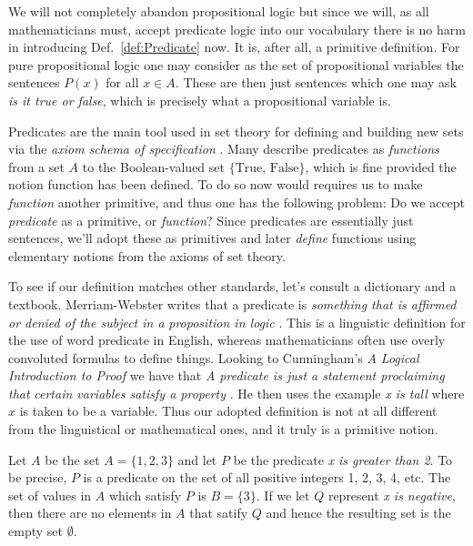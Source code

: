        We will not completely abandon propositional logic but since we will,
        as all mathematicians must, accept predicate logic into our vocabulary
        there is no harm in introducing Def.~\ref{def:Predicate} now. It is,
        after all, a primitive definition. For pure propositional logic one may
        consider as the set of propositional variables the sentences
        $P(x)$ for all $x\in{A}$. These are then just sentences which one may
        ask \textit{is it true or false}, which is precisely what a
        propositional variable is.
        \par\hfill\par
        Predicates are the main tool used in set theory for defining and
        building new sets via the \textit{axiom schema of specification}%
        . Many describe predicates as
        \textit{functions} from a set $A$ to the Boolean-valued set
        $\{\text{True},\,\text{False}\}$, which is fine provided the notion
        function has been defined. To do so now would requires us to make
        \textit{function} another primitive, and thus one has the following
        problem: Do we accept \textit{predicate} as a primitive, or
        \textit{function}? Since predicates are essentially just sentences,
        we'll adopt these as primitives and later \textit{define} functions
        using elementary notions from the axioms of set theory.
        \par\hfill\par
        To see if our definition matches other standards, let's consult a
        dictionary and a textbook. Merriam-Webster writes that a predicate is
        \textit{something that is affirmed or denied of the subject in a}
        \textit{proposition in logic} \cite{MerriamWebsterPredicateDef}. This is
        a linguistic definition for the use of word predicate in English,
        whereas mathematicians often use overly convoluted formulas to define
        things. Looking to Cunningham's \textit{A Logical Introduction to Proof}
        we have that \textit{A predicate is just a statement proclaiming that}
        \textit{certain variables satisfy a property}
        \cite{Cunningham2010}. He then uses the example \textit{x is tall} where
        $x$ is taken to be a variable. Thus our adopted definition is not at all
        different from the linguistical or mathematical ones, and it truly is a
        primitive notion.
        \begin{example}
            Let $A$ be the set $A=\{1,2,3\}$ and let $P$ be the predicate
            \textit{x is greater than 2}. To be precise, $P$ is a predicate on
            the set of all positive integers 1, 2, 3, 4, etc. The set of values
            in $A$ which satisfy $P$ is $B=\{3\}$. If we let $Q$ represent
            \textit{x is negative}, then there are no elements in $A$ that
            satify $Q$ and hence the resulting set is the empty set $\emptyset$.
        \end{example}
